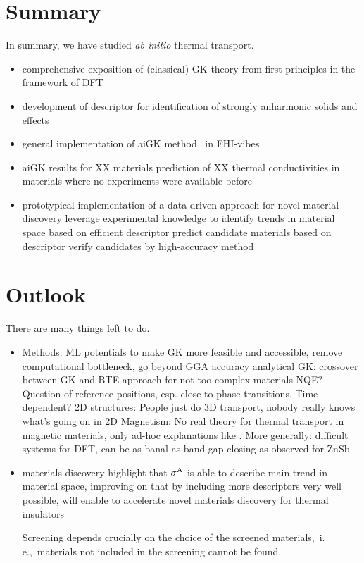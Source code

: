\section{Summary}

In summary, we have studied \emph{ab initio} thermal transport.

\begin{itemize}
	\item comprehensive exposition of (classical) GK theory from first principles in the framework of DFT
	\item development of descriptor for identification of strongly anharmonic solids and effects~\cite{Knoop2020}
	\item general implementation of aiGK method~\cite{Carbogno2016} in FHI-vibes~\cite{FHI-vibes}
	\item aiGK results for XX materials
		\subitem prediction of XX thermal conductivities in materials where no experiments were available before
	\item prototypical implementation of a data-driven approach for novel material discovery
		\subitem leverage experimental knowledge to identify trends in material space based on efficient descriptor
		\subitem predict candidate materials based on descriptor
		\subitem verify candidates by high-accuracy method
\end{itemize}

\section{Outlook}

There are many things left to do.

\begin{itemize}
	\item Methods:
		\subitem ML potentials to make GK more feasible and accessible, remove computational bottleneck, go beyond GGA accuracy  
		\subitem analytical GK: crossover between GK and BTE approach for not-too-complex materials
			\subsubitem NQE? \cite{shulumba2017,sutherland2021}
		\subitem Question of reference positions, esp. close to phase transitions. Time-dependent?
		\subitem 2D structures: People just do 3D transport, nobody really knows what's going on in 2D
		\subitem Magnetism: No real theory for thermal transport in magnetic materials, only ad-hoc explanations like \cite{stockem2018}.
		\subitem More generally: difficult systems for DFT, can be as banal as band-gap closing as observed for ZnSb
	\item materials discovery
		\subitem highlight that $\sigma^\mathrm{A}$ is able to describe main trend in material space, improving on that by including more descriptors very well possible, will enable to accelerate novel materials discovery for thermal insulators
		
		\subitem Screening depends crucially on the choice of the screened materials,~i.\,e.,~materials not included in the screening cannot be found.
\end{itemize}